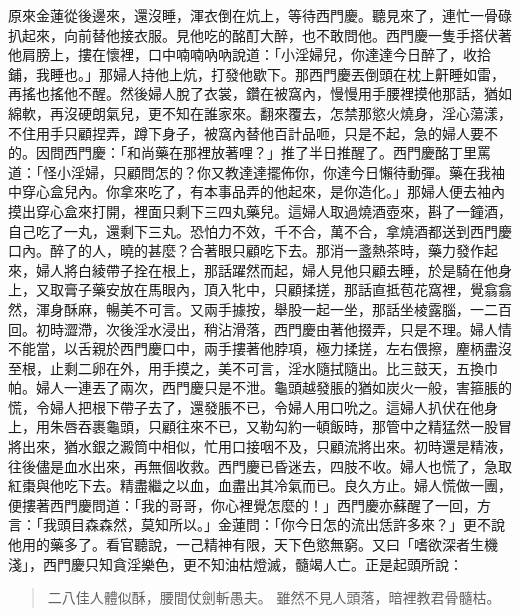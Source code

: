 原來金蓮從後邊來，還沒睡，渾衣倒在炕上，等待西門慶。聽見來了，連忙一骨碌扒起來，向前替他接衣服。見他吃的酩酊大醉，也不敢問他。西門慶一隻手搭伏著他肩膀上，摟在懷裡，口中喃喃吶吶說道：「小淫婦兒，你達達今日醉了，收拾鋪，我睡也。」那婦人持他上炕，打發他歇下。那西門慶丟倒頭在枕上鼾睡如雷，再搖也搖他不醒。然後婦人脫了衣裳，鑽在被窩內，慢慢用手腰裡摸他那話，猶如綿軟，再沒硬朗氣兒，更不知在誰家來。翻來覆去，怎禁那慾火燒身，淫心蕩漾，不住用手只顧捏弄，蹲下身子，被窩內替他百計品咂，只是不起，急的婦人要不的。因問西門慶：「和尚藥在那裡放著哩？」推了半日推醒了。西門慶酩丁里罵道：「怪小淫婦，只顧問怎的？你又教達達擺佈你，你達今日懶待動彈。藥在我袖中穿心盒兒內。你拿來吃了，有本事品弄的他起來，是你造化。」那婦人便去袖內摸出穿心盒來打開，裡面只剩下三四丸藥兒。這婦人取過燒酒壺來，斟了一鐘酒，自己吃了一丸，還剩下三丸。恐怕力不效，千不合，萬不合，拿燒酒都送到西門慶口內。醉了的人，曉的甚麼？合著眼只顧吃下去。那消一盞熱茶時，藥力發作起來，婦人將白綾帶子拴在根上，那話躍然而起，婦人見他只顧去睡，於是騎在他身上，又取膏子藥安放在馬眼內，頂入牝中，只顧揉搓，那話直抵苞花窩裡，覺翕翕然，渾身酥麻，暢美不可言。又兩手據按，舉股一起一坐，那話坐棱露腦，一二百回。初時澀滯，次後淫水浸出，稍沾滑落，西門慶由著他掇弄，只是不理。婦人情不能當，以舌親於西門慶口中，兩手摟著他脖項，極力揉搓，左右偎擦，麈柄盡沒至根，止剩二卵在外，用手摸之，美不可言，淫水隨拭隨出。比三鼓天，五換巾帕。婦人一連丟了兩次，西門慶只是不泄。龜頭越發脹的猶如炭火一般，害箍脹的慌，令婦人把根下帶子去了，還發脹不已，令婦人用口吮之。這婦人扒伏在他身上，用朱唇吞裹龜頭，只顧往來不已，又勒勾約一頓飯時，那管中之精猛然一股冒將出來，猶水銀之澱筒中相似，忙用口接咽不及，只顧流將出來。初時還是精液，往後儘是血水出來，再無個收救。西門慶已昏迷去，四肢不收。婦人也慌了，急取紅棗與他吃下去。精盡繼之以血，血盡出其冷氣而已。良久方止。婦人慌做一團，便摟著西門慶問道：「我的哥哥，你心裡覺怎麼的！」西門慶亦蘇醒了一回，方言：「我頭目森森然，莫知所以。」金蓮問：「你今日怎的流出恁許多來？」更不說他用的藥多了。看官聽說，一己精神有限，天下色慾無窮。又曰「嗜欲深者生機淺」，西門慶只知貪淫樂色，更不知油枯燈滅，髓竭人亡。正是起頭所說：
\begin{quote}
二八佳人體似酥，腰間仗劍斬愚夫。
雖然不見人頭落，暗裡教君骨髓枯。
\end{quote}

